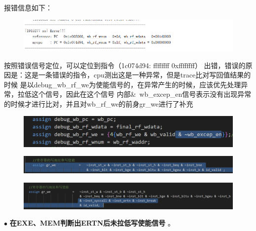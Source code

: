 \documentclass[11pt]{article}
\begin{document}
      报错信息如下：
      \begin{figure}[H]
          \centering
          \includegraphics[width=15cm]{fig/12.png}
        \end{figure}
      按照错误信号定位，可以定位到指令（1c074d94:	ffffffff 	0xffffffff）
      出错，错误的原因是：这是一条错误的指令，cpu测出这是一种异常，但是trace比对写回值结果的时候
      是以debug_wb_rf_we为使能信号的，在异常产生的时候，应该优先处理异常，拉低这个信号，因此在这个信号
      内部\&~wb_excep_en信号表示没有出现异常的时候才进行比对，并且对wb_rf_we的前身gr_we进行了补充
      \begin{figure}[H]
          \centering
          \includegraphics[width=15cm]{fig/13.png}
        \end{figure}
        \begin{figure}[H]
            \centering
            \includegraphics[width=15cm]{fig/14.png}
          \end{figure}
          \begin{figure}[H]
            \centering
            \includegraphics[width=15cm]{fig/15.png}
          \end{figure}

       \noindent
        $\bullet$
        \textbf{在EXE、MEM判断出ERTN后未拉低写使能信号        }。
      
\end{document}
